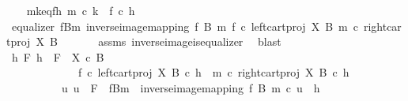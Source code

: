 \begin{isabellebody}
\ \ \isamarkupfalse%
\ mk{\isacharunderscore}{\kern0pt}eq{\isacharunderscore}{\kern0pt}fh{\isacharcolon}{\kern0pt}\ {\isachardoublequoteopen}m\ {\isasymcirc}\isactrlsub c\ k\ {\isacharequal}{\kern0pt}\ f\ {\isasymcirc}\isactrlsub c\ h{\isachardoublequoteclose}\isanewline
\isanewline
\ \ \isamarkupfalse%
\ {\isachardoublequoteopen}equalizer\ {\isacharparenleft}{\kern0pt}f\isactrlsup {\isacharminus}{\kern0pt}B{\isasymrparr}\isactrlbsub m\isactrlesub {\isacharparenright}{\kern0pt}\ {\isacharparenleft}{\kern0pt}inverse{\isacharunderscore}{\kern0pt}image{\isacharunderscore}{\kern0pt}mapping\ f\ B\ m{\isacharparenright}{\kern0pt}\ {\isacharparenleft}{\kern0pt}f\ {\isasymcirc}\isactrlsub c\ left{\isacharunderscore}{\kern0pt}cart{\isacharunderscore}{\kern0pt}proj\ X\ B{\isacharparenright}{\kern0pt}\ {\isacharparenleft}{\kern0pt}m\ {\isasymcirc}\isactrlsub c\ right{\isacharunderscore}{\kern0pt}cart{\isacharunderscore}{\kern0pt}proj\ X\ B\ {\isacharparenright}{\kern0pt}{\isachardoublequoteclose}\isanewline
\ \ \ \ \isamarkupfalse%
\ assms\ inverse{\isacharunderscore}{\kern0pt}image{\isacharunderscore}{\kern0pt}is{\isacharunderscore}{\kern0pt}equalizer{}\ \isamarkupfalse%
\ blast\isanewline
\ \ \isamarkupfalse%
\ \isamarkupfalse%
\ {\isachardoublequoteopen}{\isasymforall}h\ F{\isachardot}{\kern0pt}\ h\ {\isacharcolon}{\kern0pt}\ F\ {\isasymrightarrow}\ {\isacharparenleft}{\kern0pt}X\ {\isasymtimes}\isactrlsub c\ B{\isacharparenright}{\kern0pt}\ \isanewline
\ \ \ \ \ \ \ \ \ \ \ \ {\isasymand}\ {\isacharparenleft}{\kern0pt}f\ {\isasymcirc}\isactrlsub c\ left{\isacharunderscore}{\kern0pt}cart{\isacharunderscore}{\kern0pt}proj\ X\ B{\isacharparenright}{\kern0pt}\ {\isasymcirc}\isactrlsub c\ h\ {\isacharequal}{\kern0pt}\ {\isacharparenleft}{\kern0pt}m\ {\isasymcirc}\isactrlsub c\ right{\isacharunderscore}{\kern0pt}cart{\isacharunderscore}{\kern0pt}proj\ X\ B{\isacharparenright}{\kern0pt}\ {\isasymcirc}\isactrlsub c\ h\ {\isasymlongrightarrow}\isanewline
\ \ \ \ \ \ \ \ \ \ {\isacharparenleft}{\kern0pt}{\isasymexists}{\isacharbang}{\kern0pt}u{\isachardot}{\kern0pt}\ u\ {\isacharcolon}{\kern0pt}\ F\ {\isasymrightarrow}\ {\isacharparenleft}{\kern0pt}f\isactrlsup {\isacharminus}{\kern0pt}B{\isasymrparr}\isactrlbsub m\isactrlesub {\isacharparenright}{\kern0pt}\ {\isasymand}\ inverse{\isacharunderscore}{\kern0pt}image{\isacharunderscore}{\kern0pt}mapping\ f\ B\ m\ {\isasymcirc}\isactrlsub c\ u\ {\isacharequal}{\kern0pt}\ h{\isacharparenright}{\kern0pt}{\isachardoublequoteclose}\isanewline

\end{isabellebody}
